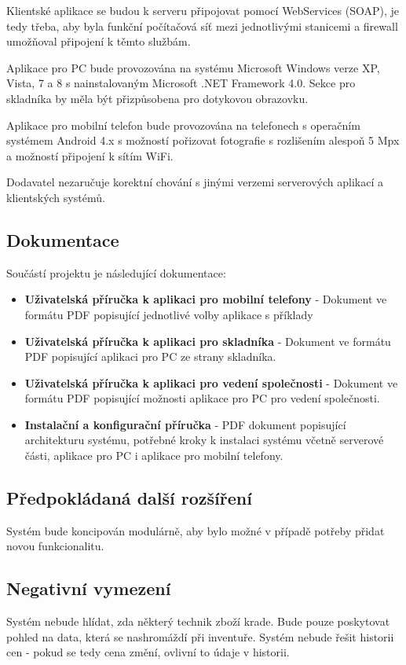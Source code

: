 \documentclass[a4paper,10pt]{article}
\begin{document}
Klientské aplikace se budou k serveru připojovat pomocí WebServices (SOAP), je tedy třeba, aby byla funkční počítačová síť mezi jednotlivými stanicemi a firewall umožňoval připojení k těmto službám.

Aplikace pro PC bude provozována na systému Microsoft Windows verze XP, Vista, 7 a 8 s nainstalovaným Microsoft .NET Framework 4.0. Sekce pro skladníka by měla být přizpůsobena pro dotykovou obrazovku.

Aplikace pro mobilní telefon bude provozována na telefonech s operačním systémem Android 4.x s možností pořizovat fotografie s rozlišením alespoň 5 Mpx a možností připojení k sítím WiFi.

Dodavatel nezaručuje korektní chování s jinými verzemi serverových aplikací a klientských systémů.

\subsection{Dokumentace}
Součástí projektu je následující dokumentace:
\begin{itemize}
	\item \textbf{Uživatelská příručka k aplikaci pro mobilní telefony} - Dokument ve formátu PDF popisující jednotlivé volby aplikace s příklady
	\item \textbf{Uživatelská příručka k aplikaci pro skladníka} - Dokument ve formátu PDF popisující aplikaci pro PC ze strany skladníka. 
	\item \textbf{Uživatelská příručka k aplikaci pro vedení společnosti} - Dokument ve formátu PDF popisující možnosti aplikace pro PC pro vedení společnosti.
	\item \textbf{Instalační a konfigurační příručka} - PDF dokument popisující architekturu systému, potřebné kroky k instalaci systému včetně serverové části, aplikace pro PC i aplikace pro mobilní telefony.
\end{itemize}

\subsection{Předpokládaná další rozšíření}
Systém bude koncipován modulárně, aby bylo možné v případě potřeby přidat novou funkcionalitu.

\subsection{Negativní vymezení}
Systém nebude hlídat, zda některý technik zboží krade. Bude pouze poskytovat pohled na data, která se nashromáždí při inventuře. Systém nebude řešit historii cen - pokud se tedy cena změní, ovlivní to údaje v historii.
\end{document}
